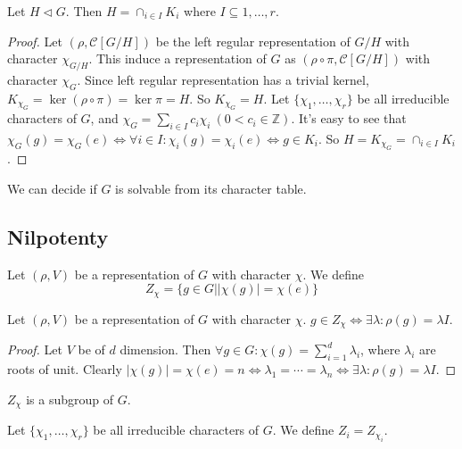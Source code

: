 \documentclass[12pt]{book}
\begin{document}
	\begin{theorem}
		Let $H\triangleleft G$. Then $H=\cap_{i\in I}K_i$ where $I\subseteq {1,\dots,r}$.
	\end{theorem}
	\begin{proof}
		Let $(\rho,\mathcal C[G/H])$ be the left regular representation of $G/H$ with character $\chi_{G/H}$. This induce a representation of $G$ as $(\rho\circ\pi,\mathcal C[G/H])$ with character $\chi_{G}$. Since left regular representation has a trivial kernel, $K_{\chi_G}=\ker (\rho\circ\pi)=\ker \pi =H$. So $K_{\chi_G}=H$. Let $\{\chi_1,\dots,\chi_r\}$ be all irreducible characters of $G$, and $\chi_G=\sum_{i\in I} c_i\chi_i\ (0<c_i\in \mathbb Z)$. It's easy to see that $\chi_G(g)=\chi_G(e)\Leftrightarrow\forall i\in I:\chi_i(g)=\chi_i(e)\Leftrightarrow g\in K_i$. So $H=K_{\chi_G}=\cap_{i\in I}K_i$.
	\end{proof}
	
	\begin{method}
		We can decide if $G$ is solvable from its character table.
	\end{method}
	\subsection{Nilpotenty}
	\begin{definition}
		Let $(\rho,V)$ be a representation of $G$ with character $\chi$. We define
		\begin{equation}
			Z_\chi=\{g\in G||\chi(g)|=\chi(e)\}
		\end{equation}
	\end{definition}
	\begin{theorem}
		Let $(\rho,V)$ be a representation of $G$ with character $\chi$. $g\in Z_\chi\Leftrightarrow\exists \lambda: \rho(g)=\lambda I$.
	\end{theorem}
	\begin{proof}
		Let $V$ be of $d$ dimension. Then $\forall g\in G: \chi(g)=\sum_{i=1}^d\lambda_i$, where $\lambda_i$ are roots of unit. Clearly $|\chi(g)|=\chi(e)=n\Leftrightarrow \lambda_1=\cdots=\lambda_n\Leftrightarrow\exists \lambda: \rho(g)=\lambda I$.
	\end{proof}
	\begin{corollary}
		 $Z_\chi$ is a subgroup of $G$.
	\end{corollary}
	
	\begin{definition}
		Let $\{\chi_1,\dots,\chi_r\}$ be all irreducible characters of $G$. We define $Z_i=Z_{\chi_i}$.
	\end{definition}
	
\end{document}
